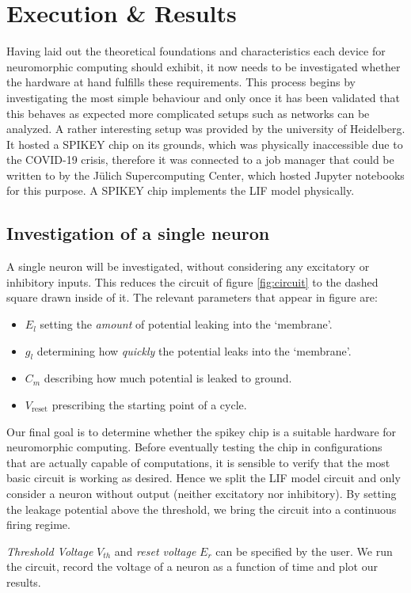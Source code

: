 \documentclass[a4paper,twocolumn]{article}
\begin{document}
\section{Execution \& Results}
Having laid out the theoretical foundations and characteristics each device 
for neuromorphic computing should exhibit,  it now needs to be investigated 
whether the hardware at hand fulfills these requirements.  This process begins 
by investigating the most simple behaviour and only once it has been validated 
that this behaves as expected more complicated setups such as networks 
can be analyzed.
A rather interesting setup was provided by the university of Heidelberg. It
hosted a SPIKEY chip on its grounds, which was physically inaccessible due to
the COVID-19 crisis, therefore it was connected to a job manager that could be
written to by the Jülich Supercomputing Center, which hosted Jupyter notebooks
for this purpose. A SPIKEY chip implements the LIF model physically.

\subsection{Investigation of a single neuron}
A single neuron will be investigated,  without considering any excitatory or
inhibitory inputs.  This reduces the circuit of figure \ref{fig:circuit}
to the dashed square drawn inside of it. The relevant parameters
that appear in figure are:
\begin{itemize}
    \item $E_l$ setting the \textit{amount} of potential leaking into the `membrane'.
    \item $g_l$ determining how \textit{quickly} the potential leaks into the `membrane'.
    \item $C_m$ describing how much potential is leaked to ground.
    \item $V_\text{reset}$ prescribing the starting point of a cycle.
\end{itemize}

Our final goal is to determine whether the spikey chip is a suitable hardware for
neuromorphic computing.  Before eventually testing the chip in configurations
that are actually capable of computations,  it is sensible to verify that the
most basic circuit is working as desired.  Hence we split the LIF model circuit
and only consider a neuron without output (neither excitatory nor inhibitory).
By setting the leakage potential above the threshold, we bring the circuit into
a continuous firing regime. \par
\textit{Threshold Voltage} $V_{th}$ and \textit{reset voltage} $E_r$ can be
specified by the user.  We run the circuit,  record the voltage of a neuron as
a function of time and plot our results.
\end{document}
